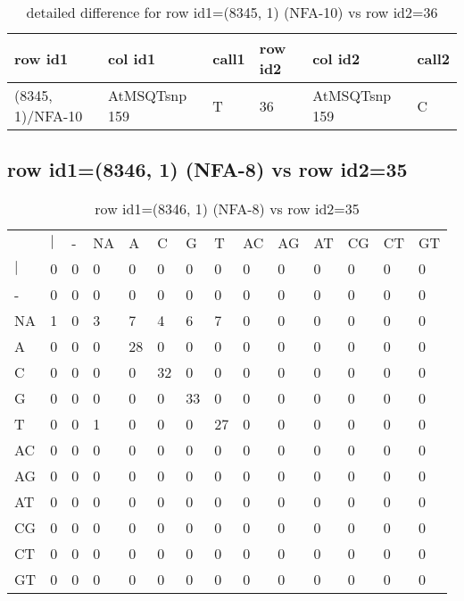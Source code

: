 \begin{center}
\begin{longtable}{|l|l|l|l|l|l|}
\caption{detailed difference for row id1=(8345, 1) (NFA-10) vs row id2=36} \label{table_dm557}\\
\hline
row id1&col id1&call1&row id2&col id2&call2\\
\hline
(8345, 1)/NFA-10&AtMSQTsnp 159&T&36&AtMSQTsnp 159&C\\
\hline
\end{longtable}
\end{center}

\subsection{row id1=(8346, 1) (NFA-8) vs row id2=35}
\begin{center}
\begin{longtable}{|l|l|l|l|l|l|l|l|l|l|l|l|l|l|}
\caption{row id1=(8346, 1) (NFA-8) vs row id2=35} \label{table_dm558}\\
\hline
\\
\hline
&$|$&-&NA&A&C&G&T&AC&AG&AT&CG&CT&GT\\
$|$&0&0&0&0&0&0&0&0&0&0&0&0&0\\
-&0&0&0&0&0&0&0&0&0&0&0&0&0\\
NA&1&0&3&7&4&6&7&0&0&0&0&0&0\\
A&0&0&0&28&0&0&0&0&0&0&0&0&0\\
C&0&0&0&0&32&0&0&0&0&0&0&0&0\\
G&0&0&0&0&0&33&0&0&0&0&0&0&0\\
T&0&0&1&0&0&0&27&0&0&0&0&0&0\\
AC&0&0&0&0&0&0&0&0&0&0&0&0&0\\
AG&0&0&0&0&0&0&0&0&0&0&0&0&0\\
AT&0&0&0&0&0&0&0&0&0&0&0&0&0\\
CG&0&0&0&0&0&0&0&0&0&0&0&0&0\\
CT&0&0&0&0&0&0&0&0&0&0&0&0&0\\
GT&0&0&0&0&0&0&0&0&0&0&0&0&0\\
\hline
\end{longtable}
\end{center}

